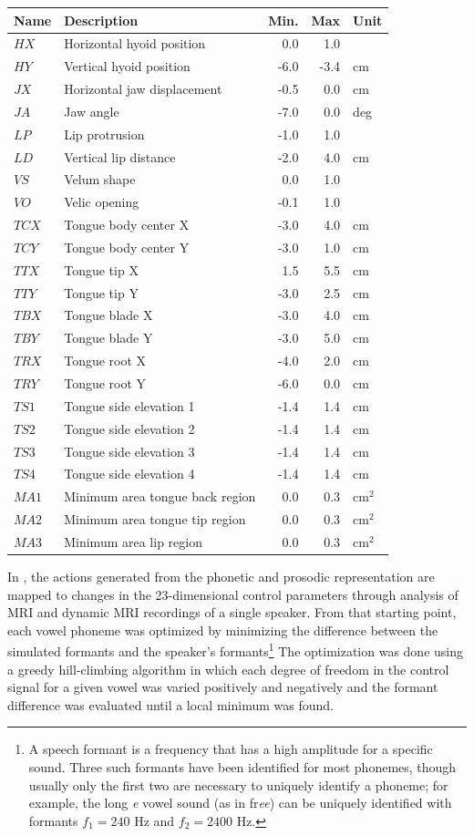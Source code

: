 \documentclass{article}
\begin{document}
\begin{tabular}{llrrl}
\toprule
{\bf Name} & {\bf Description} & {\bf Min.} & {\bf Max} & {\bf Unit} \\
\midrule
$HX$ & Horizontal hyoid position & 0.0 & 1.0 & \\
$HY$ & Vertical hyoid position & -6.0 & -3.4 & cm \\
$JX$ & Horizontal jaw displacement & -0.5 & 0.0 & cm \\
$JA$ & Jaw angle & -7.0 & 0.0 & deg \\
$LP$ & Lip protrusion & -1.0 & 1.0 & \\
$LD$ & Vertical lip distance & -2.0 & 4.0 & cm \\
$VS$ & Velum shape & 0.0 & 1.0 & \\
$VO$ & Velic opening & -0.1 & 1.0 & \\
$TCX$ & Tongue body center X & -3.0 & 4.0 & cm \\
$TCY$ & Tongue body center Y & -3.0 & 1.0 & cm \\
$TTX$ & Tongue tip X & 1.5 & 5.5 & cm \\
$TTY$ & Tongue tip Y & -3.0 & 2.5 & cm \\
$TBX$ & Tongue blade X & -3.0 & 4.0 & cm \\
$TBY$ & Tongue blade Y & -3.0 & 5.0 & cm \\
$TRX$ & Tongue root X & -4.0 & 2.0 & cm \\
$TRY$ & Tongue root Y & -6.0 & 0.0 & cm \\
$TS1$ & Tongue side elevation 1 & -1.4 & 1.4 & cm \\
$TS2$ & Tongue side elevation 2 & -1.4 & 1.4 & cm \\
$TS3$ & Tongue side elevation 3 & -1.4 & 1.4 & cm \\
$TS4$ & Tongue side elevation 4 & -1.4 & 1.4 & cm \\
$MA1$ & Minimum area tongue back region & 0.0 & 0.3 & cm$^2$ \\
$MA2$ & Minimum area tongue tip region & 0.0 & 0.3 & cm$^2$ \\
$MA3$ & Minimum area lip region & 0.0 & 0.3 & cm$^2$ \\
\bottomrule
\end{tabular}

In \citet{birkholz2013}, the actions generated from
the phonetic and prosodic representation
are mapped to changes in
the 23-dimensional control parameters
through analysis of MRI and dynamic MRI recordings
of a single speaker.
From that starting point,
each vowel phoneme was optimized
by minimizing the difference
between the simulated formants
and the speaker's formants\footnote{A
speech formant is a frequency that
has a high amplitude for a specific sound.
Three such formants have been identified
for most phonemes, though usually only the first
two are necessary to uniquely identify
a phoneme; for example, the long \textit{e}
vowel sound (as in fr\textit{ee})
can be uniquely identified with
formants $f_1=240$ Hz and $f_2=2400$ Hz.}
The optimization
was done using a greedy hill-climbing algorithm
in which each degree of freedom in
the control signal for a given vowel
was varied positively and negatively
and the formant difference was evaluated
until a local minimum was found.
\end{document}

